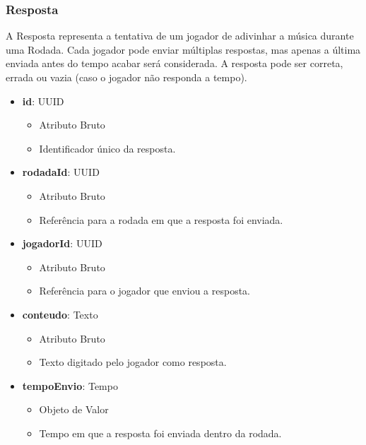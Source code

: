     \subsubsection{Resposta}
    A Resposta representa a tentativa de um jogador de adivinhar a música durante uma Rodada. Cada jogador pode enviar múltiplas respostas, mas apenas a última enviada antes do tempo acabar será considerada. A resposta pode ser correta, errada ou vazia (caso o jogador não responda a tempo).
    \begin{itemize}
        \item \textbf{id}: UUID  
              \begin{itemize}
                  \item Atributo Bruto
                  \item Identificador único da resposta.
              \end{itemize}
    
        \item \textbf{rodadaId}: UUID  
              \begin{itemize}
                  \item Atributo Bruto
                  \item Referência para a rodada em que a resposta foi enviada.
              \end{itemize}
    
        \item \textbf{jogadorId}: UUID  
              \begin{itemize}
                  \item Atributo Bruto
                  \item Referência para o jogador que enviou a resposta.
              \end{itemize}
    
        \item \textbf{conteudo}: Texto  
              \begin{itemize}
                  \item Atributo Bruto
                  \item Texto digitado pelo jogador como resposta.
              \end{itemize}
    
        \item \textbf{tempoEnvio}: Tempo  
              \begin{itemize}
                  \item Objeto de Valor
                  \item Tempo em que a resposta foi enviada dentro da rodada.
              \end{itemize}
    

\end{itemize}
